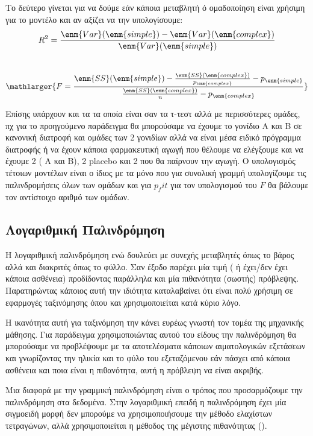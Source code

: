 Το δεύτερο γίνεται για να δούμε εάν κάποια μεταβλητή ό ομαδοποίηση
είναι χρήσιμη για το μοντέλο και αν αξίζει να την υπολογίσουμε:
$$R^2=\frac{\enm{Var}(\enm{simple})-\enm{Var}(\enm{complex})}{\enm{Var}(\enm{simple})}$$
\\
$$\mathlarger{F =\frac{\enm{SS}(\enm{simple}) - \frac{\enm{SS}(\enm{complex})}{p_{\enm{complex}}} - p_{\enm{simple}}} {\frac{\enm{SS}(\enm{complex})}{n} - p_{\enm{complex}}}}$$

Επίσης υπάρχουν και τα  τα οποία είναι σαν τα τ-τεστ αλλά με περισσότερες ομάδες, πχ για το προηγούμενο
παράδειγμα θα μπορούσαμε να έχουμε το γονίδιο Α και Β σε κανονική διατροφή και ομάδες
των 2 γονιδίων αλλά να είναι μέσα ειδικό πρόγραμμα διατροφής ή να έχουν κάποια
φαρμακευτική αγωγή που θέλουμε να ελέγξουμε και να έχουμε 2 ( A και B), 2
placebo και 2 που θα παίρνουν την αγωγή. Ο υπολογισμός τέτοιων μοντέλων είναι ο ίδιος με
τα  μόνο που για συνολική γραμμή υπολογίζουμε τις παλινδρομήσεις όλων των ομάδων
και για $p_fit$ για τον υπολογισμού του $F$ θα βάλουμε τον αντίστοιχο αριθμό των ομάδων.
\subsection{Λογαριθμική Παλινδρόμηση}
Η λογαριθμική παλινδρόμηση ενώ δουλεύει με συνεχής μεταβλητές  όπως το βάρος αλλά και διακριτές
όπως το φύλλο. Σαν έξοδο παρέχει μία
 τιμή ( ή έχει/δεν έχει κάποια ασθένεια) προδίδοντας παράλληλα και μία
πιθανότητα (σωστής) πρόβλεψης. Παρατηρώντας κάποιος αυτή την ιδιότητα καταλαβαίνει
ότι είναι πολύ χρήσιμη σε εφαρμογές ταξινόμησης όπου και χρησιμοποιείται κατά κύριο
λόγο.

Η ικανότητα αυτή για ταξινόμηση την κάνει ευρέως γνωστή τον τομέα της μηχανικής
μάθησης. Για παράδειγμα χρησιμοποιώντας αυτού του είδους την παλινδρόμηση θα
μπορούσαμε να προβλέψουμε με τα αποτελέσματα κάποιων αιματολογικών εξετάσεων και
γνωρίζοντας την ηλικία και το φύλο του εξεταζόμενου εάν πάσχει από κάποια ασθένεια και
ποια είναι η πιθανότητα, αυτή η πρόβλεψη να είναι ακριβής.

Μια διαφορά με την
γραμμική παλινδρόμηση είναι ο τρόπος που προσαρμόζουμε την παλινδρόμηση στα
δεδομένα. Στην λογαριθμική επειδή η παλινδρόμηση έχει μία σιγμοειδή μορφή δεν
μπορούμε να χρησιμοποιήσουμε την μέθοδο ελαχίστων τετραγώνων, αλλά χρησιμοποιείται
η μέθοδος της μέγιστης πιθανότητας ().

